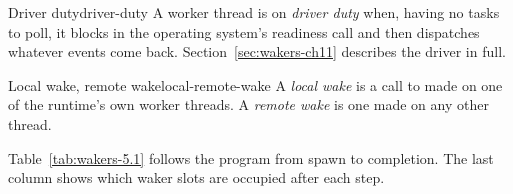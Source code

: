 \begin{definition}{Driver duty}{driver-duty}
    A worker thread is on \emph{driver duty} when, having no tasks to poll, it blocks in the operating system's readiness call and then dispatches whatever events come back. Section~\ref{sec:wakers-ch11} describes the driver in full.
\end{definition}

\begin{definition}{Local wake, remote wake}{local-remote-wake}
    A \emph{local wake} is a call to  made on one of the runtime's own worker threads. A \emph{remote wake} is one made on any other thread.
\end{definition}

Table~\ref{tab:wakers-5.1} follows the program from spawn to completion. The last column shows which waker slots are occupied after each step.

